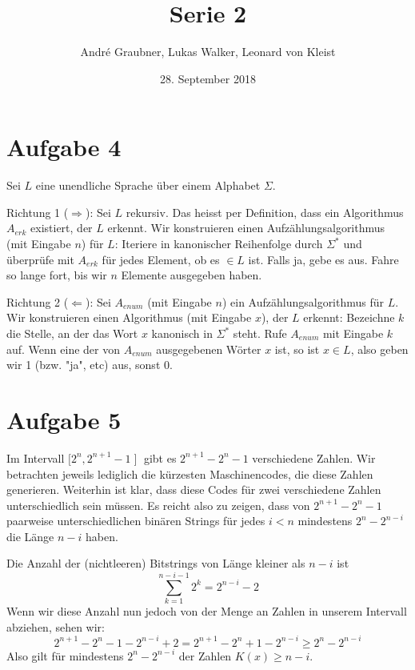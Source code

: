 \documentclass[a4paper]{article}
\title{Serie 2}
\author{André Graubner, Lukas Walker, Leonard von Kleist}
\date{28. September 2018}
\begin{document}
 

\maketitle

\section{Aufgabe 4}
	
	Sei $L$ eine unendliche Sprache über einem Alphabet $\Sigma$.
	
	Richtung 1 ($\Rightarrow$):
	Sei $L$ rekursiv.
	Das heisst per Definition, dass ein Algorithmus $A_{erk}$ existiert, der $L$ erkennt.
	Wir konstruieren einen Aufzählungsalgorithmus (mit Eingabe $n$) für $L$:
	Iteriere in kanonischer Reihenfolge durch $\Sigma^*$ und überprüfe mit $A_{erk}$ für 
	jedes Element, ob es $\in L$ ist. Falls ja, gebe es aus. Fahre so lange fort, bis wir
	$n$ Elemente ausgegeben haben.

	Richtung 2 ($\Leftarrow$):
	Sei $A_{enum}$ (mit Eingabe $n$) ein Aufzählungsalgorithmus für $L$.
	Wir konstruieren einen Algorithmus (mit Eingabe $x$), der $L$ erkennt:
	Bezeichne $k$ die Stelle, an der das Wort $x$ kanonisch in $\Sigma^*$ steht.
	Rufe $A_{enum}$ mit Eingabe $k$ auf. Wenn eine der von $A_{enum}$ ausgegebenen
	Wörter $x$ ist, so ist $x \in L$, also geben wir 1 (bzw. "ja", etc) aus, sonst 0.

\section{Aufgabe 5}

	Im Intervall $\mathopen[2^n, 2^{n+1}-1 \mathopen]$ gibt es $2^{n+1} - 2^n - 1$ verschiedene Zahlen.
	Wir betrachten jeweils lediglich die kürzesten Maschinencodes, die diese Zahlen generieren.
	Weiterhin ist klar, dass diese Codes für zwei verschiedene Zahlen unterschiedlich sein müssen. 
	Es reicht also zu zeigen, dass von $2^{n+1} - 2^n - 1$ paarweise unterschiedlichen binären Strings
	für jedes $i < n$ mindestens $2^n - 2^{n-i}$ die Länge $n - i$ haben.

	Die Anzahl der (nichtleeren) Bitstrings von Länge kleiner als $n - i$ ist 
	\[\sum_{k=1}^{n-i-1} 2^k = 2^{n-i} - 2\]
	Wenn wir diese Anzahl nun jedoch von der Menge an Zahlen in unserem Intervall abziehen, sehen wir:
	\[2^{n+1} - 2^{n} - 1 - 2^{n-i} + 2 = 2^{n+1} - 2^{n} + 1 - 2^{n-i} \geq 2^n - 2^{n-i}\]
	Also gilt für mindestens $2^n - 2^{n-i}$ der Zahlen $K(x) \geq n-i$.
\end{document}
